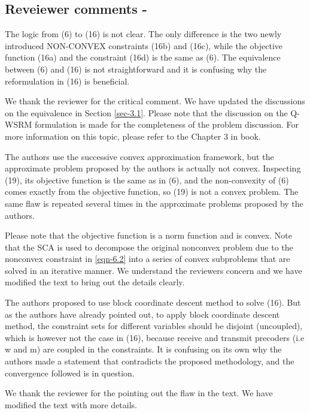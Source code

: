 \subsection*{Reveiewer comments - }

 The logic from (6) to (16) is not clear. The only difference is the two newly introduced NON-CONVEX constraints (16b) and (16c), while the objective function (16a) and the constraint (16d) is the same as (6). The equivalence between (6) and (16) is not straightforward and it is confusing why the reformulation in (16) is beneficial.

\resp We thank the reviewer for the critical comment. We have updated the discussions on the equivalence in Section \ref{sec-3.1}. Please note that the discussion on the \ac{Q-WSRM} formulation is made for the completeness of the problem discussion. For more information on this topic, please refer to the Chapter 3 in \cite{neely2010stochastic} book.

 The authors use the successive convex approximation framework, but the approximate problem proposed by the authors is actually not convex. Inspecting (19), its objective function is the same as in (6), and the non-convexity of (6) comes exactly from the objective function, so (19) is not a convex problem. The same flaw is repeated several times in the approximate problems proposed by the authors.

\resp Please note that the objective function is a norm function and is convex. Note that the \ac{SCA} is used to decompose the original nonconvex problem due to the nonconvex constraint in \eqref{eqn-6.2} into a series of convex subproblems that are solved in an iterative manner. We understand the reviewers concern and we have modified the text to bring out the details clearly.

 The authors proposed to use block coordinate descent method to solve (16). But as the authors have already pointed out, to apply block coordinate descent method, the constraint sets for different variables should be disjoint (uncoupled), which is however not the case in (16), because receive and transmit precoders (i.e w and m) are coupled in the constraints. It is confusing on its own why the authors made a statement that contradicts the proposed methodology, and the convergence followed is in question.

\resp We thank the reviewer for the pointing out the flaw in the text. We have modified the text with more details.

